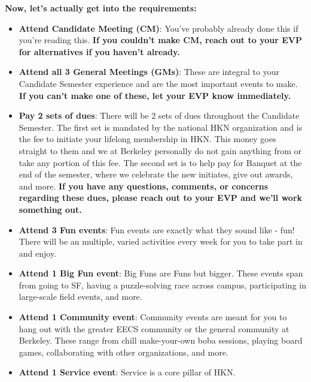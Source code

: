\documentclass[11pt, article, oneside]{memoir}
\begin{document}
        \textbf{Now, let's actually get into the requirements:}
            \begin{itemize}
                \item
                    \textbf{Attend Candidate Meeting (CM)}: You've probably already done this if you're reading this.
                    \textbf{If you couldn't make CM, reach out to your EVP for alternatives if you haven't already.}
                \item
                    \textbf{Attend all 3 General Meetings (GMs)}: These are integral to your Candidate Semester experience and are the most important events to make.
                    \textbf{If you can't make one of these, let your EVP know immediately.}
                \item
                    \textbf{Pay 2 sets of dues}: There will be 2 sets of dues throughout the Candidate Semester.
                    The first set is mandated by the national HKN organization and is the fee to initiate your lifelong membership in HKN.
                    This money goes straight to them and we at Berkeley personally do not gain anything from or take any portion of this fee.
                    The second set is to help pay for Banquet at the end of the semester, where we celebrate the new initiates, give out awards, and more.
                    \textbf{If you have any questions, comments, or concerns regarding these dues, please reach out to your EVP and we'll work something out.}
                \item
                    \textbf{Attend 3 Fun events}: Fun events are exactly what they sound like - fun!
                    There will be an multiple, varied activities every week for you to take part in and enjoy.
                \item
                    \textbf{Attend 1 Big Fun event}: Big Funs are Funs but bigger.
                    These events span from going to SF, having a puzzle-solving race across campus, participating in large-scale field events, and more.
                \item
                    \textbf{Attend 1 Community event}: Community events are meant for you to hang out with the greater EECS community or the general community at Berkeley.
                    These range from chill make-your-own boba sessions, playing board games, collaborating with other organizations, and more.
                \item
                    \textbf{Attend 1 Service event}: Service is a core pillar of HKN.

\end{itemize}
\end{document}
